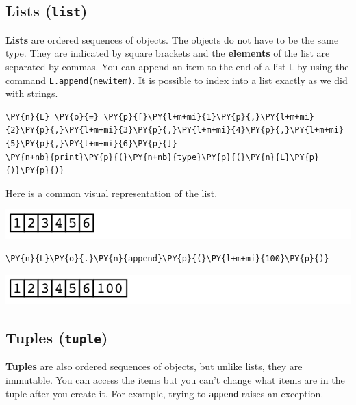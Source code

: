\subsection{Lists (\texttt{list})}


\textbf{Lists} are ordered sequences of objects.  The objects do not have to be the same type.  They are indicated by square brackets and the \textbf{elements} of the list are separated by commas.  You can append an item to the end of a list \texttt{L} by using the command \texttt{L.append(newitem)}.
It is possible to index into a list exactly as we did with strings.

\begin{Verbatim}[commandchars=\\\{\}]
\PY{n}{L} \PY{o}{=} \PY{p}{[}\PY{l+m+mi}{1}\PY{p}{,}\PY{l+m+mi}{2}\PY{p}{,}\PY{l+m+mi}{3}\PY{p}{,}\PY{l+m+mi}{4}\PY{p}{,}\PY{l+m+mi}{5}\PY{p}{,}\PY{l+m+mi}{6}\PY{p}{]}
\PY{n+nb}{print}\PY{p}{(}\PY{n+nb}{type}\PY{p}{(}\PY{n}{L}\PY{p}{)}\PY{p}{)}
\end{Verbatim}



Here is a common visual representation of the list.


\includegraphics[width=\textwidth]{./figures/list_example01.png}

\begin{Verbatim}[commandchars=\\\{\}]
\PY{n}{L}\PY{o}{.}\PY{n}{append}\PY{p}{(}\PY{l+m+mi}{100}\PY{p}{)}
\end{Verbatim}



\includegraphics[width=\textwidth]{./figures/list_example02.png}

\subsection{Tuples (\texttt{tuple})}


\textbf{Tuples} are also ordered sequences of objects, but unlike lists, they are immutable.  You can access the items but you can’t change what items are in the tuple after you create it.  For example, trying to \texttt{append} raises an exception.

